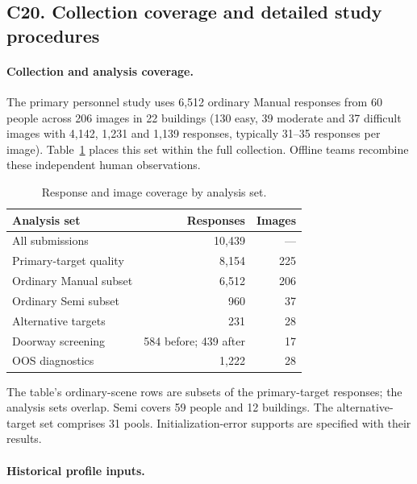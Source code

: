 
\subsection*{C20. Collection coverage and detailed study procedures}

\paragraph{Collection and analysis coverage.}

The primary personnel study uses 6,512 ordinary Manual responses from 60 people across 206 images in 22 buildings (130 easy, 39 moderate and 37 difficult images with 4,142, 1,231 and 1,139 responses, typically 31--35 responses per image). Table~\ref{tab:collection-coverage} places this set within the full collection. Offline teams recombine these independent human observations.



\begin{table}[!ht]
\centering\small
\caption{Response and image coverage by analysis set.}
\label{tab:collection-coverage}
\setlength{\tabcolsep}{4pt}\renewcommand{\arraystretch}{1.13}
\begin{tabular*}{\linewidth}{@{\extracolsep{\fill}}lrr@{}}
\hline
Analysis set & Responses & Images\\\hline
All submissions & 10,439 & ---\\
Primary-target quality & 8,154 & 225\\
\quad Ordinary Manual subset & 6,512 & 206\\
\quad Ordinary Semi subset & 960 & 37\\\hline
Alternative targets & 231 & 28\\
Doorway screening & 584 before; 439 after & 17\\
OOS diagnostics & 1,222 & 28\\\hline
\end{tabular*}
\end{table}

The table's ordinary-scene rows are subsets of the primary-target responses; the analysis sets overlap. Semi covers 59 people and 12 buildings. The alternative-target set comprises 31 pools. Initialization-error supports are specified with their results.



\paragraph{Historical profile inputs.}


